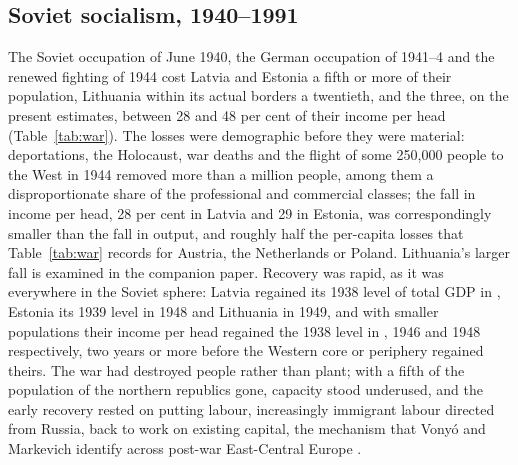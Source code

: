 \subsection{Soviet socialism, 1940--1991}

The Soviet occupation of June 1940, the German occupation of 1941--4 and the renewed fighting of 1944 cost Latvia and Estonia a fifth or more of their population, Lithuania within its actual borders a twentieth, and the three, on the present estimates, between 28 and 48 per cent of their income per head (Table~\ref{tab:war}). The losses were demographic before they were material: deportations, the Holocaust, war deaths and the flight of some 250,000 people to the West in 1944 removed more than a million people, among them a disproportionate share of the professional and commercial classes; the fall in income per head, 28 per cent in Latvia and 29 in Estonia, was correspondingly smaller than the fall in output, and roughly half the per-capita losses that Table~\ref{tab:war} records for Austria, the Netherlands or Poland. Lithuania's larger fall is examined in the companion paper. Recovery was rapid, as it was everywhere in the Soviet sphere: Latvia regained its 1938 level of total GDP in , Estonia its 1939 level in 1948 and Lithuania in 1949, and with smaller populations their income per head regained the 1938 level in \lvREGAINthirtyeight{}, 1946 and 1948 respectively, two years or more before the Western core or periphery regained theirs. The war had destroyed people rather than plant; with a fifth of the population of the northern republics gone, capacity stood underused, and the early recovery rested on putting labour, increasingly immigrant labour directed from Russia, back to work on existing capital, the mechanism that Vonyó and Markevich identify across post-war East-Central Europe \parencites[290]{vonyoinmorys2021}[108]{years_of_dependence}.

